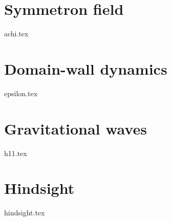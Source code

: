 










\section{Symmetron field}\label{sec:results:achi}
    {{achi.tex}}


\section{Domain-wall dynamics}\label{sec:results:epsilon}
    {{epsilon.tex}}

\section{Gravitational waves}\label{sec:results:h11}
    {{h11.tex}}


\section{Hindsight}\label{sec:results:hindsight}
    {{hindsight.tex}}



